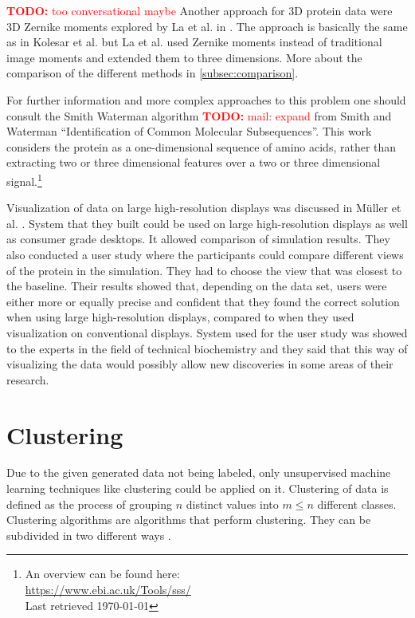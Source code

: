\documentclass[journal]{vgtc}       %
\newcommand{\todo}[1]{\textcolor{red}{\textbf{TODO:} #1}}
\begin{document}
\todo{too conversational maybe}
Another approach for 3D protein data were 3D Zernike moments explored by La et al. in \cite{3dsurfer}. The approach is basically the same as in Kolesar et al. but La et al.  used Zernike moments instead of traditional image moments and extended them to three dimensions. More about the comparison of the different methods in \ref{subsec:comparison}.
 

For further information and more complex approaches to this problem one should consult the Smith Waterman algorithm \todo{mail: expand} from Smith and Waterman ``Identification of Common Molecular Subsequences''\cite{smithwater}. This work considers the protein as a one-dimensional sequence of amino acids, rather than extracting two or three dimensional features over a two or three dimensional signal.\footnote{An overview can be found here: \\ \url{https://www.ebi.ac.uk/Tools/sss/}\\ Last retrieved \today}

Visualization of data on large high-resolution displays was discussed in M{\"u}ller et al. \cite{powerwall}. System that they built could be used on large high-resolution displays as well as consumer grade desktops. It allowed comparison of simulation results. They also conducted a user study where the participants could compare different views of the protein in the simulation. They had to choose the view that was closest to the baseline. Their results showed that, depending on the data set, users were either more or equally precise and confident that they found the correct solution when using large high-resolution displays, compared to when they used visualization on conventional displays. System used for the user study was showed to the experts in the field of technical biochemistry and they said that this way of visualizing the data would possibly allow new discoveries in some areas of their research.
\section{Clustering}

Due to the given generated data  not being  labeled, only unsupervised machine learning techniques like clustering could be applied on it. 
Clustering of data is defined as the process of grouping $n$ distinct values into $m \leq n$ different classes. Clustering algorithms are algorithms that perform clustering. They can be subdivided in two different ways \cite{iir}.
\end{document}
